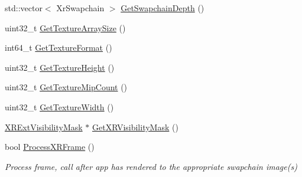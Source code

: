 \begin{DoxyCompactItemize}
std\+::vector$<$ Xr\+Swapchain $>$ \mbox{\hyperlink{class_open_x_r_provider_1_1_x_r_render_manager_a0835882f612c14539f3226425b398bcb}{Get\+Swapchain\+Depth}} ()
\item 
uint32\+\_\+t \mbox{\hyperlink{class_open_x_r_provider_1_1_x_r_render_manager_a87fa0e627b58a7892aa3e6a0efd9ab9b}{Get\+Texture\+Array\+Size}} ()
\item 
int64\+\_\+t \mbox{\hyperlink{class_open_x_r_provider_1_1_x_r_render_manager_aa5216277ffb9f00b43ba78fe0019da3f}{Get\+Texture\+Format}} ()
\item 
uint32\+\_\+t \mbox{\hyperlink{class_open_x_r_provider_1_1_x_r_render_manager_ae019694eb7b728af00f29eb09872a763}{Get\+Texture\+Height}} ()
\item 
uint32\+\_\+t \mbox{\hyperlink{class_open_x_r_provider_1_1_x_r_render_manager_abee521a9347693c61be94f78af0a1602}{Get\+Texture\+Mip\+Count}} ()
\item 
uint32\+\_\+t \mbox{\hyperlink{class_open_x_r_provider_1_1_x_r_render_manager_a6d9fe3b04d4786f66455cac3bd9fa115}{Get\+Texture\+Width}} ()
\item 
\mbox{\hyperlink{class_open_x_r_provider_1_1_x_r_ext_visibility_mask}{X\+R\+Ext\+Visibility\+Mask}} $\ast$ \mbox{\hyperlink{class_open_x_r_provider_1_1_x_r_render_manager_a7bcc0021dd457e08fe53f7841d0c7c66}{Get\+X\+R\+Visibility\+Mask}} ()
\item 
bool \mbox{\hyperlink{class_open_x_r_provider_1_1_x_r_render_manager_aebe4bca3de5bdec26ea4dfbc641273b5}{Process\+X\+R\+Frame}} ()
\begin{DoxyCompactList}\small\item\em Process frame, call after app has rendered to the appropriate swapchain image(s) \end{DoxyCompactList}\end{DoxyCompactItemize}
